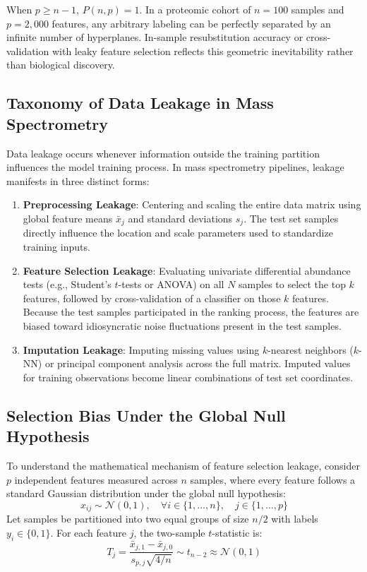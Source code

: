 \documentclass[11pt,twoside,openright]{book}
\begin{document}
When $p \ge n - 1$, $P(n, p) = 1$. In a proteomic cohort of $n = 100$ samples and $p = 2,000$ features, any arbitrary labeling can be perfectly separated by an infinite number of hyperplanes. In-sample resubstitution accuracy or cross-validation with leaky feature selection reflects this geometric inevitability rather than biological discovery.

\subsection{Taxonomy of Data Leakage in Mass Spectrometry}

Data leakage occurs whenever information outside the training partition influences the model training process. In mass spectrometry pipelines, leakage manifests in three distinct forms:

\begin{enumerate}
    \item \textbf{Preprocessing Leakage}: Centering and scaling the entire data matrix using global feature means $\bar{x}_j$ and standard deviations $s_j$. The test set samples directly influence the location and scale parameters used to standardize training inputs.
    \item \textbf{Feature Selection Leakage}: Evaluating univariate differential abundance tests (e.g., Student's $t$-tests or ANOVA) on all $N$ samples to select the top $k$ features, followed by cross-validation of a classifier on those $k$ features. Because the test samples participated in the ranking process, the features are biased toward idiosyncratic noise fluctuations present in the test samples.
    \item \textbf{Imputation Leakage}: Imputing missing values using $k$-nearest neighbors ($k$-NN) or principal component analysis across the full matrix. Imputed values for training observations become linear combinations of test set coordinates.
\end{enumerate}

\subsection{Selection Bias Under the Global Null Hypothesis}

To understand the mathematical mechanism of feature selection leakage, consider $p$ independent features measured across $n$ samples, where every feature follows a standard Gaussian distribution under the global null hypothesis:
\begin{equation}
x_{ij} \sim \mathcal{N}(0, 1), \quad \forall i \in \{1, \dots, n\}, \quad j \in \{1, \dots, p\}
\end{equation}
Let samples be partitioned into two equal groups of size $n/2$ with labels $y_i \in \{0, 1\}$. For each feature $j$, the two-sample $t$-statistic is:
\begin{equation}
T_j = \frac{\bar{x}_{j, 1} - \bar{x}_{j, 0}}{s_{p, j} \sqrt{4/n}} \sim t_{n - 2} \approx \mathcal{N}(0, 1)
\end{equation}
\end{document}
